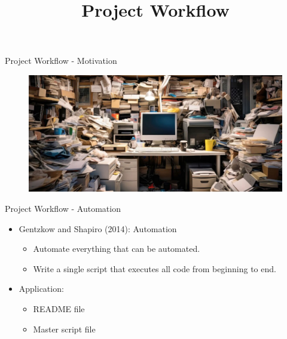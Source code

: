 \documentclass{beamer}
\title[]{Project Workflow}
\date{}
\begin{document}
\maketitle

\beamertemplatenavigationsymbolsempty
\begin{frame}{Project Workflow - Motivation}
    \begin{figure}
        \includegraphics[scale=0.35]{clutter.jpeg}
    \end{figure}      
\end{frame}

\begin{frame}{Project Workflow - Automation}
    \begin{itemize}
        \item Gentzkow and Shapiro (2014): Automation
            \begin{itemize}
                \item Automate everything that can be automated.
                \item Write a single script that executes all code from beginning to end.
            \end{itemize}
        \item Application:
            \begin{itemize}
                \item README file
                \item Master script file
            \end{itemize}
    \end{itemize}
\end{frame}
\end{document}
